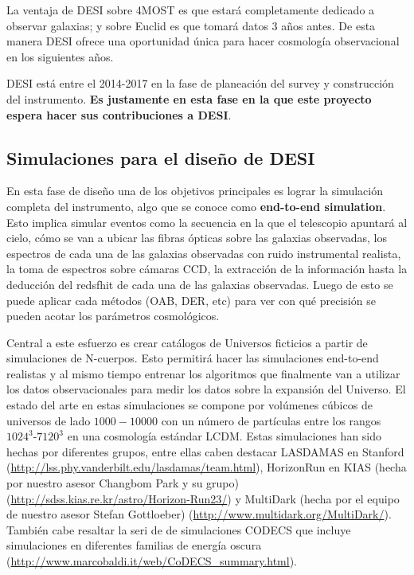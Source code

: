 La ventaja de DESI sobre 4MOST es que estar\'a completamente dedicado
a observar galaxias; y sobre Euclid es que tomar\'a datos 3 a\~nos
antes. De esta manera DESI ofrece una oportunidad \'unica para hacer
cosmolog\'ia observacional en los siguientes a\~nos. 

DESI est\'a entre el 2014-2017 en la fase de planeaci\'on del survey y
construcci\'on del instrumento. {\bf Es justamente en esta fase en la que
este proyecto espera hacer sus contribuciones a DESI}.


\subsection{Simulaciones para el dise\~no de DESI}

En esta fase de dise\~no una de los objetivos principales es lograr la
simulaci\'on completa del  instrumento, algo que se conoce como {\bf
  end-to-end simulation}. Esto implica simular eventos como la
secuencia en la que el telescopio apuntar\'a al cielo, c\'omo se van a
ubicar las fibras \'opticas sobre las galaxias observadas, los
espectros de cada una de las galaxias observadas con ruido
instrumental realista, la toma de espectros sobre c\'amaras CCD, la
extracci\'on de la informaci\'on hasta la deducci\'on del redsfhit de
cada una de las galaxias observadas. 
Luego de esto se puede aplicar
cada m\'etodos (OAB, DER, etc) para ver con qu\'e precisi\'on se
pueden acotar los par\'ametros cosmol\'ogicos. 

Central a este esfuerzo es crear cat\'alogos de Universos ficticios a
partir de simulaciones de N-cuerpos. 
Esto permitir\'a hacer las
simulaciones end-to-end realistas y al mismo tiempo entrenar los
algoritmos que finalmente van a utilizar los datos observacionales
para medir los datos sobre la expansi\'on del Universo. El estado del
arte en estas simulaciones se compone por vol\'umenes c\'ubicos de
universos  de lado $1000-10000$\hMpc
con un n\'umero de part\'iculas entre los rangos
$1024^3$-$7120^3$ en una cosmolog\'ia est\'andar LCDM. Estas
simulaciones han sido hechas por diferentes grupos, entre ellas caben
destacar LASDAMAS en Stanford
(\url{http://lss.phy.vanderbilt.edu/lasdamas/team.html}), HorizonRun en KIAS (hecha por nuestro asesor Changbom Park y su grupo)
(\url{http://sdss.kias.re.kr/astro/Horizon-Run23/}) y MultiDark (hecha
por el equipo de nuestro asesor Stefan Gottloeber)
(\url{http://www.multidark.org/MultiDark/}). Tambi\'en cabe resaltar
la seri de de simulaciones CODECS que incluye simulaciones en
diferentes familias de energ\'ia oscura
(\url{http://www.marcobaldi.it/web/CoDECS_summary.html}). 

